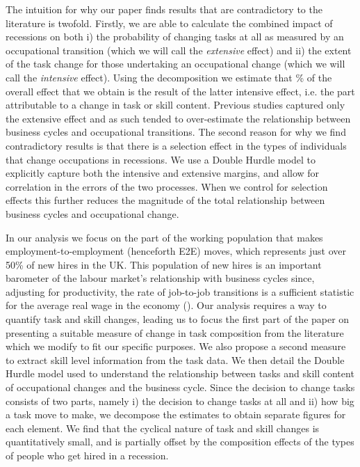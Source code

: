 \documentclass[11pt, oneside]{article}
\begin{document}
	
	


	\vspace{2mm}


\noindent The intuition for why our paper finds results that are contradictory to the literature is twofold.  Firstly, we are able to calculate the combined impact of recessions on both i) the probability of changing tasks at all as measured by an occupational transition (which we will call the \textit{extensive} effect) and ii) the extent of the task change for those undertaking an occupational change (which we will call the \textit{intensive} effect). Using the \cite{Mcdonald1980} decomposition we estimate that \hspace{-1mm}\% of the overall effect that we obtain is the result of the latter intensive effect, i.e. the part attributable to a change in task or skill content. Previous studies captured only the extensive effect and as such tended to over-estimate the relationship between business cycles and occupational transitions. The second reason for why we find contradictory results is that there is a selection effect in the types of individuals that change occupations in recessions. We use a Double Hurdle model to explicitly capture both the intensive and extensive margins, and allow for correlation in the errors of the two processes. When we control for selection effects this further reduces the magnitude of the total relationship between business cycles and occupational change.



	
	\vspace{2mm}
	
	In our analysis we focus on the part of the working population that makes employment-to-employment (henceforth E2E) moves, which represents just over 50\% of new hires in the UK. This population of new hires is an important barometer of the labour market's relationship with  business cycles since, adjusting for productivity, the rate of job-to-job transitions is a sufficient statistic for the average real wage in the economy (\cite{MoscariniPostelVinay}). Our analysis requires a way to quantify task and skill changes, leading us to focus the first part of the paper on presenting a suitable measure of change in task composition from the literature which we modify to fit our specific purposes. We also propose a second measure to extract skill level information from the task data. We then detail the Double Hurdle model used to understand the relationship between tasks and skill content of occupational changes and the business cycle. Since the decision to change tasks consists of two parts, namely i) the decision to change tasks at all and ii) how big a task move to make, we decompose the estimates to obtain separate figures for each element. We find that the cyclical nature of task and skill changes is quantitatively small, and is partially offset by the composition effects of the types of people who get hired in a recession. 
	
\end{document}
